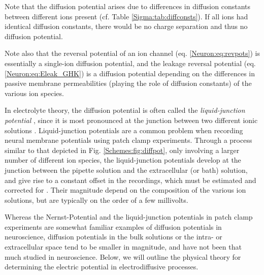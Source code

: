 Note that the diffusion potential arises due to differences in diffusion constants between different ions present  (cf. Table \ref{Sigma:tab:diffconsts}). If all ions had identical diffusion constants, there would be no charge separation and thus no diffusion potential. 

Note also that the reversal potential of an ion channel (eq. \ref{Neuron:eq:revpots}) is essentially a single-ion diffusion potential, and the leakage reversal potential (eq. \ref{Neuron:eq:Eleak_GHK}) is a diffusion potential depending on the differences in passive membrane permeabilities (playing the role of diffusion constants) of the various ion species.

In electrolyte theory, the diffusion potential is often called the \textit{liquid-junction potential} , since it is most pronounced at the junction between two different ionic solutions \cite{Sokalski2001}. Liquid-junction potentials are a common problem when recording neural membrane potentials using patch clamp experiments. Through a process similar to that depicted in Fig. \ref{Schemes:fig:diffpot}, only involving a larger number of different ion species, 
the liquid-junction potentials develop at the junction between the pipette solution and the extracellular (or bath) solution, and give rise to a constant offset in the recordings, which must be estimated and corrected for \cite{barry1991}. Their magnitude depend on the composition of the various ion solutions, but are typically on the order of a few millivolts. 

Whereas the Nernst-Potential and the liquid-junction potentials in patch clamp experiments are somewhat familiar examples of diffusion potentials in neuroscience, diffusion potentials in the bulk solutions or the intra- or extracellular space tend to be smaller in magnitude, and have not been that much studied in neuroscience. Below, we will outline the physical theory for determining the electric potential in electrodiffusive processes.


